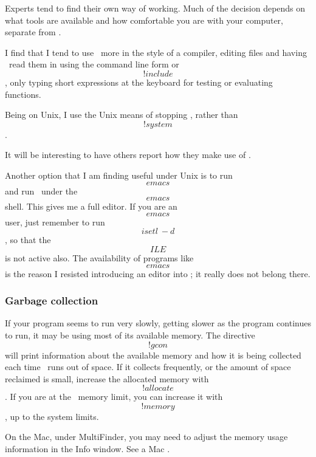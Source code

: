 Experts tend to find their own way of working.
Much of the decision depends on what tools are available
and how comfortable you are with your computer, separate from \ISETL\@.

I find that I tend to use \ISETL\ more in the style of a compiler,
editing files and having \ISETL\ read them in using the command line
form or \[!include\], only typing short expressions at the keyboard
for testing or evaluating functions.

Being on Unix, I use the Unix means of stopping \ISETL, rather than
\[!system\].  

It will be interesting to have others report how they make use of
\ISETL\@.

Another option that I am finding useful under Unix is to run \[emacs\]
and run \ISETL\ under the \[emacs\] shell.  This gives me a full
editor.  If you are an \[emacs\] user, just remember to run
\[isetl~-d\], so that the \[ILE\] is not active also.  The
availability of programs like \[emacs\] is the reason I resisted
introducing an editor into \ISETL; it really does not belong there.

\subsubsection{Garbage collection}
If your program seems to run very slowly, getting slower as the
program continues to run, it may be using most of its
available memory.
The directive \[!gc on\] will print information about the available
memory and how it is being collected each time \ISETL\ runs out of
space.  If it collects frequently, or the amount of space reclaimed is
small, increase the allocated memory with \[!allocate\].  If you are
at the \ISETL\ memory limit, you can increase it with \[!memory\], up
to the system limits.

On the Mac, under MultiFinder, you may need to adjust the memory usage
information in the Info window.  See a Mac \GURU.

